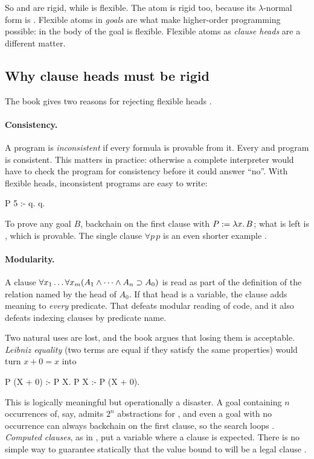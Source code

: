 So  and  are rigid, while  is flexible.
The atom  is rigid too, because its $\lambda$-normal form is .
Flexible atoms in \emph{goals} are what make higher-order programming possible: in the body of
 the goal  is flexible.
Flexible atoms as \emph{clause heads} are a different matter.

\subsection{Why clause heads must be rigid}\label{sec:hoprog-rigidheads}

The book gives two reasons for rejecting flexible heads .

\paragraph{Consistency.} A program is \emph{inconsistent} if every formula is provable from it. Every
\fohc{} and \fohh{} program is consistent. This matters in practice: otherwise a complete interpreter would
have to check the program for consistency before it could answer ``no''. With flexible heads,
inconsistent programs are easy to write:
\begin{lprolog}
P 5 :- q.
q.
\end{lprolog}
To prove any goal $B$, backchain on the first clause with $P := \lambda x.\,B$; what is left is , which
is provable. The single clause $\forall p\,p$ is an even shorter example .

\paragraph{Modularity.} A clause $\forall x_1\ldots\forall x_m(A_1\wedge\cdots\wedge A_n\supset A_0)$ is read as
part of the definition of the relation named by the head of $A_0$. If that head is a variable, the clause
adds meaning to \emph{every} predicate. That defeats modular reading of code, and it also defeats
indexing clauses by predicate name.

Two natural uses are lost, and the book argues that losing them is acceptable. \emph{Leibniz
equality} (two terms are equal if they satisfy the same properties) would turn $x+0=x$ into
\begin{lprolog}
P (X + 0) :- P X.
P X :- P (X + 0).
\end{lprolog}
This is logically meaningful but operationally a disaster. A goal containing $n$ occurrences of, say,
 admits $2^n$ abstractions for , and even a goal with no occurrence can always
backchain on the first clause, so the search loops . \emph{Computed clauses}, as in
, put a variable where a clause is expected. There is no simple way to
guarantee statically that the value bound to  will be a legal clause .

